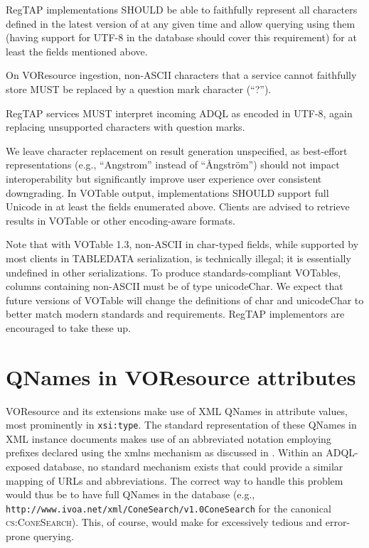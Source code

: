 \documentclass[11pt,a4paper]{ivoa}
\newcommand{\vorent}[1]{\textsc{#1}}
\begin{document}
RegTAP implementations SHOULD be able to faithfully represent all
characters defined in the latest version of \citep{std:UNICODE} at
any given time and allow querying using them (having support for UTF-8
in the database should cover this requirement) for at least the fields
mentioned above.

On VOResource ingestion, non-ASCII characters that a service cannot
faithfully store MUST be replaced by a question mark character (``?'').

RegTAP services MUST interpret incoming ADQL as encoded in UTF-8,
again replacing unsupported characters with question marks.

We leave character replacement on result generation unspecified, as
best-effort representations (e.g., ``Angstrom'' instead of ``Ångström'')
should not impact interoperability but significantly improve user
experience over consistent downgrading.  In VOTable output,
implementations SHOULD support full Unicode in at least the fields
enumerated above.  Clients are advised to retrieve results in VOTable or
other encoding-aware formats.

Note that with VOTable 1.3, non-ASCII in char-typed fields, while
supported by most clients in TABLEDATA serialization, is technically
illegal; it is essentially undefined in other serializations.  To
produce standards-compliant VOTables, columns containing non-ASCII must
be of type unicodeChar.  We expect that future versions of VOTable will
change the definitions of char and unicodeChar to better match modern
standards and requirements.  RegTAP implementors are encouraged to take
these up.





\section{QNames in VOResource attributes}

\label{qnameatts}

VOResource and its extensions make use of XML QNames in attribute
values, most prominently in \texttt{xsi:type}.  The standard
representation of these QNames in XML instance documents makes use of an
abbreviated notation employing prefixes declared using the xmlns mechanism
as discussed in \citep{std:XMLNS}.  Within an ADQL-exposed database, no
standard mechanism exists that could provide a similar mapping of URLs
and abbreviations.  The correct way to handle this problem would thus be
to have full QNames in the database (e.g.,
\texttt{{http://www.ivoa.net/xml/ConeSearch/v1.0}ConeSearch} for the
canonical \vorent{cs:ConeSearch}).  This, of course, would make for
excessively tedious and error-prone querying.
\end{document}

